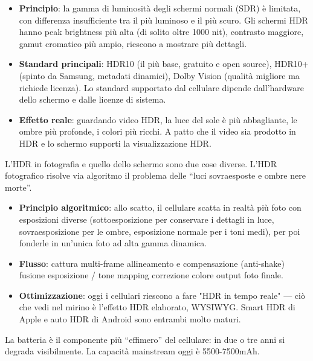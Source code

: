 \begin{itemize}
  \item \textbf{Principio}: la gamma di luminosità degli schermi normali (SDR) è limitata, con differenza insufficiente tra il più luminoso e il più scuro. Gli schermi HDR hanno peak brightness più alta (di solito oltre 1000 nit), contrasto maggiore, gamut cromatico più ampio, riescono a mostrare più dettagli.
  \item \textbf{Standard principali}: HDR10 (il più base, gratuito e open source), HDR10+ (spinto da Samsung, metadati dinamici), Dolby Vision (qualità migliore ma richiede licenza). Lo standard supportato dal cellulare dipende dall'hardware dello schermo e dalle licenze di sistema.
  \item \textbf{Effetto reale}: guardando video HDR, la luce del sole è più abbagliante, le ombre più profonde, i colori più ricchi. A patto che il video sia prodotto in HDR e lo schermo supporti la visualizzazione HDR.
\end{itemize}


L'HDR in fotografia e quello dello schermo sono due cose diverse. L'HDR fotografico risolve via algoritmo il problema delle “luci sovraesposte e ombre nere morte”.

\begin{itemize}
  \item \textbf{Principio algoritmico}: allo scatto, il cellulare scatta in realtà più foto con esposizioni diverse (sottoesposizione per conservare i dettagli in luce, sovraesposizione per le ombre, esposizione normale per i toni medi), per poi fonderle in un'unica foto ad alta gamma dinamica.
  \item \textbf{Flusso}: cattura multi-frame allineamento e compensazione (anti-shake) fusione esposizione / tone mapping correzione colore output foto finale.
  \item \textbf{Ottimizzazione}: oggi i cellulari riescono a fare "HDR in tempo reale" — ciò che vedi nel mirino è l'effetto HDR elaborato, WYSIWYG. Smart HDR di Apple e auto HDR di Android sono entrambi molto maturi.
\end{itemize}


La batteria è il componente più “effimero” del cellulare: in due o tre anni si degrada visibilmente. La capacità mainstream oggi è 5500-7500mAh.

